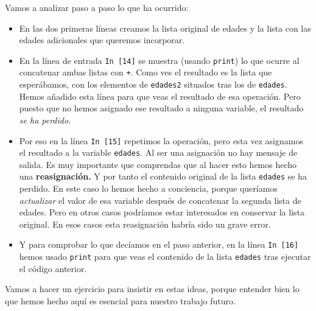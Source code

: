 \documentclass[10pt,a4paper]{article}\usepackage[]{graphicx}\usepackage[]{color}
\newcounter {cont01}
\begin{document}
Vamos a analizar paso a paso lo que ha ocurrido:
\begin{itemize}
  \item En las dos primeras líneas creamos la lista original de edades y la lista con las edades adicionales que queremos incorporar.

  \item En la línea de entrada {\tt In [14]} se muestra (usando {\tt print}) lo que ocurre al concatenar ambas listas con {\tt +}. Como ves el resultado es la lista que esperábamos, con los elementos de {\tt edades2} situados tras los de {\tt edades}. Hemos añadido esta línea para que veas el resultado de esa operación. Pero puesto que no hemos asignado ese resultado a ninguna variable, el resultado {\em se ha perdido}.

  \item Por eso en la línea {\tt In [15]} repetimos la operación, pero esta vez asignamos el resultado a la variable {\tt edades}. Al ser una asignación no hay mensaje de salida. Es muy importante que comprendas que al hacer esto hemos hecho una {\bf reasignación.} Y por tanto el contenido original de la lista {\tt edades} se ha perdido. En este caso lo hemos hecho a conciencia, porque queríamos {\em actualizar} el valor de esa variable después de concatenar la segunda lista de edades. Pero en otros casos podríamos estar interesados en conservar la lista original. En esos casos esta reasignación habría sido un grave error.

  \item Y para comprobar lo que decíamos en el paso anterior, en la línea {\tt In [16]} hemos usado {\tt print} para que veas el contenido de la lista {\tt edades} tras ejecutar el código anterior.
\end{itemize}

Vamos a hacer un ejercicio para insistir en estas ideas, porque entender bien lo que hemos hecho aquí es esencial para nuestro trabajo futuro.
\end{document}
